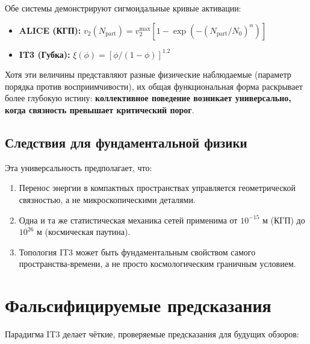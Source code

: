\documentclass[12pt,a4paper]{article}
\begin{document}
Обе системы демонстрируют сигмоидальные кривые активации:
\begin{itemize}
    \item \textbf{ALICE (КГП):} $v_2(N_{\mathrm{part}}) = v_2^{\max}[1 - \exp(-(N_{\mathrm{part}}/N_0)^\alpha)]$
    \item \textbf{IT3 (Губка):} $\xi(\phi) = [\phi/(1-\phi)]^{1.2}$
\end{itemize}

Хотя эти величины представляют разные физические наблюдаемые (параметр порядка против восприимчивости), их общая функциональная форма раскрывает более глубокую истину: \textbf{коллективное поведение возникает универсально, когда связность превышает критический порог}.

\subsection{Следствия для фундаментальной физики}

Эта универсальность предполагает, что:
\begin{enumerate}
    \item Перенос энергии в компактных пространствах управляется геометрической связностью, а не микроскопическими деталями.
    \item Одна и та же статистическая механика сетей применима от $10^{-15}$ м (КГП) до $10^{26}$ м (космическая паутина).
    \item Топология IT3 может быть фундаментальным свойством самого пространства-времени, а не просто космологическим граничным условием.
\end{enumerate}

\section{Фальсифицируемые предсказания}

Парадигма IT3 делает чёткие, проверяемые предсказания для будущих обзоров:
\end{document}
